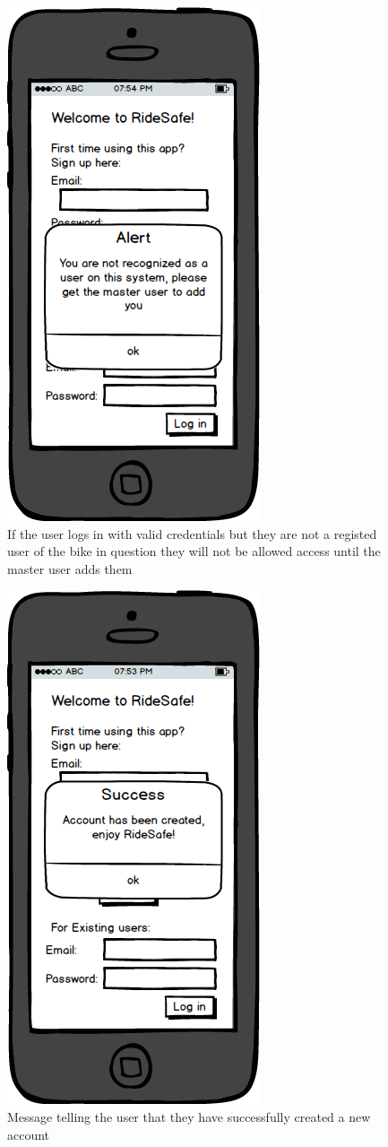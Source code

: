 \documentclass[a4paper]{report}
\begin{document}
\begin{figure}
\centering
\includegraphics[scale=0.9]{figures/prototype_2/unrecognised_warn}
\caption{If the user logs in with valid credentials but they are not a registed user of the bike in question they will not be allowed access until the master user adds them}
\end{figure}
\clearpage
\begin{figure}
\centering
\includegraphics[scale=0.9]{figures/prototype_2/create_success}
\caption{Message telling the user that they have successfully created a new account}
\end{figure}
\end{document}
